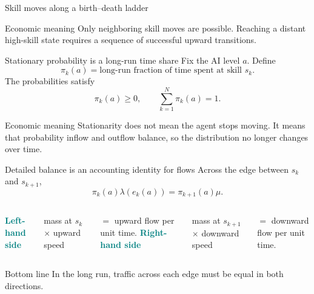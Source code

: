 \documentclass[aspectratio=169,11pt]{beamer}
\newcommand{\key}[1]{\textcolor{teal}{\textbf{#1}}}
\newcommand{\econmeaning}[1]{%
  \begin{block}{Economic meaning}
  #1
  \end{block}}
\newcommand{\bottomline}[1]{%
  \begin{alertblock}{Bottom line}
  #1
  \end{alertblock}}
\begin{document}
\begin{frame}{Skill moves along a birth--death ladder}
\centering
{}
\vspace{7mm}
\econmeaning{Only neighboring skill moves are possible. Reaching a distant high-skill state requires a sequence of successful upward transitions.}
\end{frame}

\begin{frame}{Stationary probability is a long-run time share}
Fix the AI level $a$. Define
\[
\boxed{\pi_k(a)=\text{long-run fraction of time spent at skill }s_k.}
\]
The probabilities satisfy
\[
\pi_k(a)\ge0,
\qquad
\sum_{k=1}^{N}\pi_k(a)=1.
\]
\econmeaning{Stationarity does not mean the agent stops moving. It means that probability inflow and outflow balance, so the distribution no longer changes over time.}
\end{frame}

\begin{frame}{Detailed balance is an accounting identity for flows}
Across the edge between $s_k$ and $s_{k+1}$,
\[
\boxed{\pi_k(a)\lambda(e_k(a))
=\pi_{k+1}(a)\mu.}
\]
\begin{columns}[T,onlytextwidth]
\key{Left-hand side}

mass at $s_k$ $\times$ upward speed

$=$ upward flow per unit time.
\key{Right-hand side}

mass at $s_{k+1}$ $\times$ downward speed

$=$ downward flow per unit time.
\end{columns}
\bottomline{In the long run, traffic across each edge must be equal in both directions.}
\end{frame}
\end{document}
